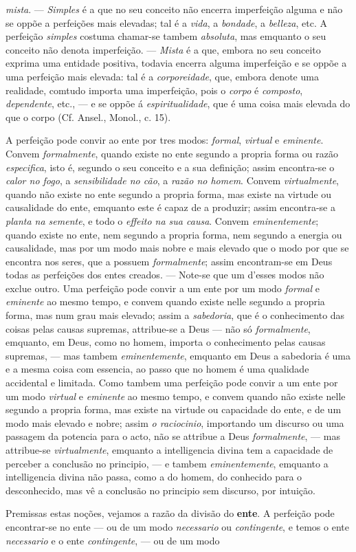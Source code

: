 \emph{mista}. --- \emph{Simples} é a que no seu conceito não encerra imperfeição alguma e não se oppõe a perfeições mais elevadas; tal é a \emph{vida}, a \emph{bondade}, a \emph{belleza}, etc. A perfeição \emph{simples} costuma chamar-se tambem \emph{absoluta}, mas emquanto o seu conceito não denota imperfeição. --- \emph{Mista} é a que, embora no seu conceito exprima uma entidade positiva, todavia encerra alguma imperfeição e se oppõe a uma perfeição mais elevada: tal é a \emph{corporeidade}, que, embora denote uma realidade, comtudo importa uma imperfeição, pois o \emph{corpo} é \emph{composto}, \emph{dependente}, etc., --- e se oppõe á \emph{espiritualidade}, que é uma coisa mais elevada do que o corpo (Cf. Ansel., Monol., c. 15).\par A perfeição pode convir ao ente por tres modos: \emph{formal}, \emph{virtual} e \emph{eminente}. Convem \emph{formalmente}, quando existe no ente segundo a propria forma ou razão \emph{especifica}, isto é, segundo o seu conceito e a sua definição; assim encontra-se o \emph{calor no fogo}, a \emph{sensibilidade no cão}, a \emph{razão no homem}. Convem \emph{virtualmente}, quando não existe no ente segundo a propria forma, mas existe na virtude ou causalidade do ente, emquanto este é capaz de a produzir; assim encontra-se a \emph{planta na semente}, e todo o \emph{effeito na sua causa}. Convem \emph{eminentemente}; quando existe no ente, nem segundo a propria forma, nem segundo a energia ou causalidade, mas por um modo mais nobre e mais elevado que o modo por que se encontra nos seres, que a possuem \emph{formalmente}; assim encontram-se em Deus todas as perfeições dos entes creados. --- Note-se que um d'esses modos não exclue outro. Uma perfeição pode convir a um ente por um modo \emph{formal} e \emph{eminente} ao mesmo tempo, e convem quando existe nelle segundo a propria forma, mas num grau mais elevado; assim a \emph{sabedoria}, que é o conhecimento das coisas pelas causas supremas, attribue-se a Deus --- não só \emph{formalmente}, emquanto, em Deus, como no homem, importa o conhecimento pelas causas supremas, --- mas tambem \emph{eminentemente}, emquanto em Deus a sabedoria é uma e a mesma coisa com essencia, ao passo que no homem é uma qualidade accidental e limitada. Como tambem uma perfeição pode convir a um ente por um modo \emph{virtual} e \emph{eminente} ao mesmo tempo, e convem quando não existe nelle segundo a propria forma, mas existe na virtude ou capacidade do ente, e de um modo mais elevado e nobre; assim \emph{o raciocinio}, importando um discurso ou uma passagem da potencia para o acto, não se attribue a Deus \emph{formalmente}, --- mas attribue-se \emph{virtualmente}, emquanto a intelligencia divina tem a capacidade de perceber a conclusão no principio, --- e tambem \emph{eminentemente}, emquanto a intelligencia divina não passa, como a do homem, do conhecido para o desconhecido, mas vê a conclusão no principio sem discurso, por intuição.\par Premissas estas noções, vejamos a razão da divisão do \textbf{ente}. A perfeição pode encontrar-se no ente --- ou de um modo \emph{necessario} ou \emph{contingente}, e temos o ente \emph{necessario} e o ente \emph{contingente}, --- ou de um modo 